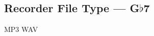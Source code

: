 \subsection[Recorder File Type]{Recorder File Type --- \UiKey{\SET}G$\flat$7}









































MP3
WAV
